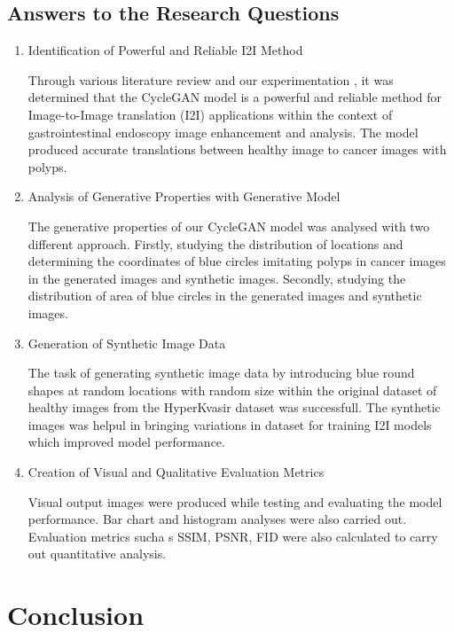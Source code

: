 \documentclass[UKenglish,12pt]{master-style}
\begin{document}
\section{Answers to the Research Questions} 
\begin{enumerate}
\item Identification of Powerful and Reliable I2I Method
    
Through various literature review and our experimentation , it was determined that the CycleGAN model is a powerful and reliable method for Image-to-Image translation (I2I) applications within the context of gastrointestinal endoscopy image enhancement and analysis. The model produced accurate translations between healthy image to cancer images with polyps.

\item Analysis of Generative Properties with Generative Model

The generative properties of our CycleGAN model was analysed with two different approach. Firstly, studying the distribution of locations and determining the coordinates of blue circles imitating polyps in cancer images in the generated images and synthetic images. Secondly, studying the distribution of area of blue circles in the generated images and synthetic images. 

\item Generation of Synthetic Image Data

The task of generating synthetic image data by introducing blue round shapes at random locations with random size within the original dataset of healthy images from the HyperKvasir dataset was successfull. The synthetic images was helpul in bringing variations in dataset for training I2I models which improved model performance.

\item Creation of Visual and Qualitative Evaluation Metrics

Visual output images were produced while testing and evaluating the model performance. Bar chart and histogram analyses were also carried out. Evaluation metrics sucha s SSIM, PSNR, FID were also calculated to carry out quantitative analysis.

\end{enumerate}

\chapter{Conclusion}
\end{document}
